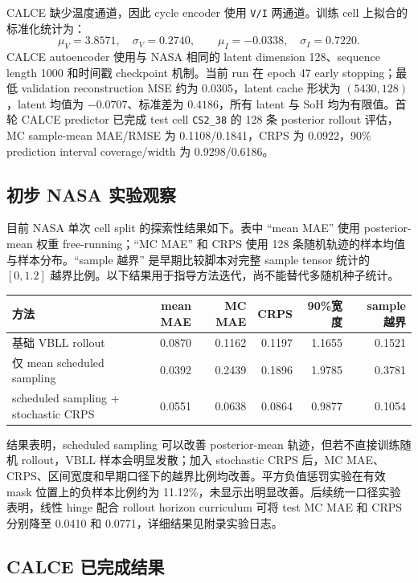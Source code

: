 \documentclass[11pt,a4paper,fontset=none]{ctexart}
\begin{document}
CALCE 缺少温度通道，因此 cycle encoder 使用 \texttt{V/I} 两通道。训练 cell 上拟合的标准化统计为：
\[
\mu_V=3.8571,\quad \sigma_V=0.2740,\qquad
\mu_I=-0.0338,\quad \sigma_I=0.7220.
\]
CALCE autoencoder 使用与 NASA 相同的 latent dimension 128、sequence length 1000 和时间戳 checkpoint 机制。当前 run 在 epoch 47 early stopping；最低 validation reconstruction MSE 约为 0.0305，latent cache 形状为 $(5430,128)$，latent 均值为 $-0.0707$、标准差为 $0.4186$，所有 latent 与 SoH 均为有限值。首轮 CALCE predictor 已完成 test cell \texttt{CS2\_38} 的 128 条 posterior rollout 评估，MC sample-mean MAE/RMSE 为 0.1108/0.1841，CRPS 为 0.0922，90\% prediction interval coverage/width 为 0.9298/0.6186。

\subsection{初步 NASA 实验观察}

目前 NASA 单次 cell split 的探索性结果如下。表中 ``mean MAE'' 使用 posterior-mean 权重 free-running；``MC MAE'' 和 CRPS 使用 128 条随机轨迹的样本均值与样本分布。``sample 越界'' 是早期比较脚本对完整 sample tensor 统计的 $[0,1.2]$ 越界比例。以下结果用于指导方法迭代，尚不能替代多随机种子统计。

\begin{table}[h]
\centering
\small
\begin{tabular}{lrrrrr}
\toprule
方法 & mean MAE & MC MAE & CRPS & 90\%宽度 & sample 越界 \\
\midrule
基础 VBLL rollout & 0.0870 & 0.1162 & 0.1197 & 1.1655 & 0.1521 \\
仅 mean scheduled sampling & 0.0392 & 0.2439 & 0.1896 & 1.9785 & 0.3781 \\
scheduled sampling + stochastic CRPS & 0.0551 & 0.0638 & 0.0864 & 0.9877 & 0.1054 \\
\bottomrule
\end{tabular}
\end{table}

结果表明，scheduled sampling 可以改善 posterior-mean 轨迹，但若不直接训练随机 rollout，VBLL 样本会明显发散；加入 stochastic CRPS 后，MC MAE、CRPS、区间宽度和早期口径下的越界比例均改善。平方负值惩罚实验在有效 mask 位置上的负样本比例约为 11.12\%，未显示出明显改善。后续统一口径实验表明，线性 hinge 配合 rollout horizon curriculum 可将 test MC MAE 和 CRPS 分别降至 0.0410 和 0.0771，详细结果见附录实验日志。

\subsection{CALCE 已完成结果}
\end{document}
